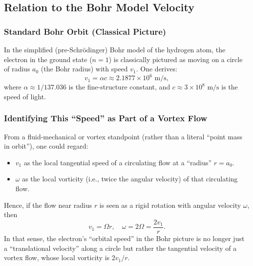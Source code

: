 \subsection{Relation to the Bohr Model Velocity}
\subsubsection{Standard Bohr Orbit (Classical Picture)}
In the simplified (pre-Schr\"odinger) Bohr model of the hydrogen atom, the electron in the ground state ($n=1$) is classically pictured as moving on a circle of radius $a_0$ (the Bohr radius) with speed $v_1$. One derives:
\begin{equation}
    v_1 = \alpha c \approx 2.1877 \times 10^6 \text{ m/s},
\end{equation}
where $\alpha \approx 1/137.036$ is the fine-structure constant, and $c \approx 3 \times 10^8 \text{ m/s}$ is the speed of light.

\subsubsection{Identifying This ``Speed'' as Part of a Vortex Flow}
From a fluid-mechanical or vortex standpoint (rather than a literal ``point mass in orbit''), one could regard:
\begin{itemize}
    \item $v_1$ as the local tangential speed of a circulating flow at a ``radius'' $r = a_0$.
    \item $\omega$ as the local vorticity (i.e., twice the angular velocity) of that circulating flow.
\end{itemize}
Hence, if the flow near radius $r$ is seen as a rigid rotation with angular velocity $\omega$, then
\begin{equation}
    v_1 = \Omega r, \quad \omega = 2\Omega = \frac{2v_1}{r}.
\end{equation}
In that sense, the electron’s ``orbital speed'' in the Bohr picture is no longer just a ``translational velocity'' along a circle but rather the tangential velocity of a vortex flow, whose local vorticity is $2 v_1 / r$.

